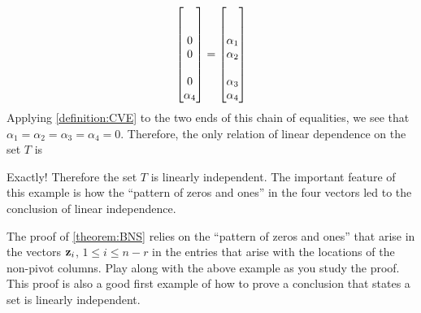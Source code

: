 \documentclass{ximera}
\begin{document}
\begin{example}
\begin{align*}
                 \begin{bmatrix} \\ \\0\\0\\ \\0\\\alpha_4\end{bmatrix}
                =
                 \begin{bmatrix} \\ \\\alpha_1\\\alpha_2\\ \\\alpha_3\\\alpha_4\end{bmatrix}
  \end{align*}
  Applying \ref{definition:CVE} to the two ends of this chain of
  equalities, we see that $\alpha_1=\alpha_2=\alpha_3=\alpha_4=0$.  
  Therefore, the only relation of linear dependence on the set $T$ is
  \begin{multipleChoice}
  \end{multipleChoice}

  \begin{feedback}[correct]
    Exactly!  Therefore the set $T$ is linearly independent.
    The important feature of this example is how the ``pattern of zeros
    and ones'' in the four vectors led to the conclusion of linear
    independence.
  \end{feedback}
\end{example}

The proof of \ref{theorem:BNS} relies on the ``pattern of zeros and
ones'' that arise in the vectors $\mathbf{z}_i$, $1\leq i\leq n-r$ in
the entries that arise with the locations of the non-pivot columns.
Play along with the above example as you study the proof.  This proof
is also a good first example of how to prove a conclusion that states
a set is linearly independent.
\end{document}
